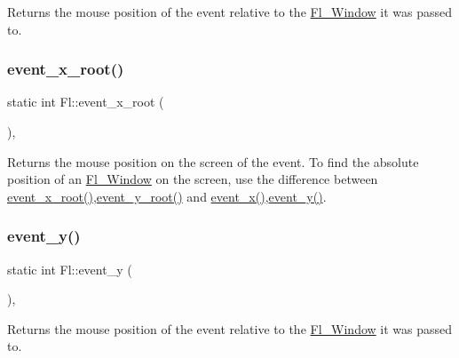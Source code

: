 Returns the mouse position of the event relative to the \hyperlink{class_fl___window}{Fl\+\_\+\+Window} it was passed to. \mbox{\label{group__fl__events_ga4c40bd0d2960354c9778fdb65a2b720d}} 
\subsubsection{\texorpdfstring{event\+\_\+x\+\_\+root()}{event\_x\_root()}}
{\footnotesize\ttfamily static int Fl\+::event\+\_\+x\+\_\+root (\begin{DoxyParamCaption}{ }\end{DoxyParamCaption})\hspace{0.3cm}{\ttfamily [inline]}, {\ttfamily [static]}}

Returns the mouse position on the screen of the event. To find the absolute position of an \hyperlink{class_fl___window}{Fl\+\_\+\+Window} on the screen, use the difference between \hyperlink{group__fl__events_ga4c40bd0d2960354c9778fdb65a2b720d}{event\+\_\+x\+\_\+root()},\hyperlink{group__fl__events_ga9801003f911eae0e49bf52b875dcaaa5}{event\+\_\+y\+\_\+root()} and \hyperlink{group__fl__events_ga91585fcbaa1e79f7452fd2d16a82136e}{event\+\_\+x()},\hyperlink{group__fl__events_ga192a0c5a37f33b9d117a69f20977c2a1}{event\+\_\+y()}. \mbox{\label{group__fl__events_ga192a0c5a37f33b9d117a69f20977c2a1}} 
\subsubsection{\texorpdfstring{event\+\_\+y()}{event\_y()}}
{\footnotesize\ttfamily static int Fl\+::event\+\_\+y (\begin{DoxyParamCaption}{ }\end{DoxyParamCaption})\hspace{0.3cm}{\ttfamily [inline]}, {\ttfamily [static]}}

Returns the mouse position of the event relative to the \hyperlink{class_fl___window}{Fl\+\_\+\+Window} it was passed to. \mbox{\label{group__fl__events_ga9801003f911eae0e49bf52b875dcaaa5}} 
